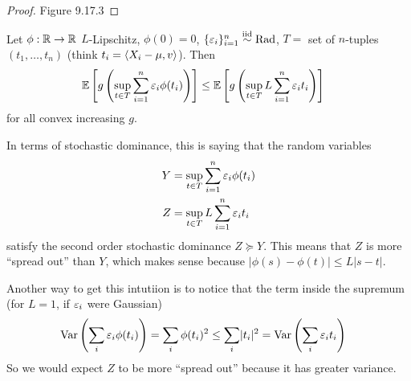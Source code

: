 \begin{proof}
  Figure 9.17.3
\end{proof}

\begin{theorem}
  Let $\phi : \mathbb{R} \to \mathbb{R}$ $L$-Lipschitz, $\phi(0) = 0$,
  $\{\varepsilon_i\}_{i=1}^n \overset{\text{iid}}{\sim} \text{Rad}$, $T =$ set of $n$-tuples $(t_1,\ldots,t_n)$
  (think $t_i = \braket{X_i - \mu, v}$). Then
  \begin{align}
    \mathbb{E}\left[g \left(
        \sup_{t \in T} \sum_{i=1}^n \varepsilon_i \phi(t_i)
    \right)\right]
    &\leq \mathbb{E}\left[
      g\left(
        \sup_{t \in T} L \sum_{i=1}^n \varepsilon_i t_i
      \right)
    \right]
  \end{align}
  for all convex increasing $g$.
\end{theorem}

In terms of stochastic dominance, this is saying that the random variables
\begin{align}
  Y &= \sup_{t \in T} \sum_{i=1}^n \varepsilon_i \phi(t_i) \\
  Z &= \sup_{t \in T} L \sum_{i=1}^n \varepsilon_i t_i
\end{align}
satisfy the second order stochastic dominance $Z \succeq Y$.
This means that $Z$ is more ``spread out'' than $Y$, which makes sense because
$\lvert \phi(s) - \phi(t) \rvert \leq L \lvert s - t \rvert$.

Another way to get this intutiion is to notice that the term inside the
supremum (for $L = 1$, if $\varepsilon_i$ were Gaussian)
\begin{align}
  \operatorname{Var}\left(\sum_{i} \varepsilon_i \phi(t_i)\right)
  &= \sum_i \phi(t_i)^2
  \leq \sum_{i} \lvert t_i \rvert^2
  = \operatorname{Var}\left(\sum_i \varepsilon_i t_i\right)
\end{align}
So we would expect $Z$ to be more ``spread out'' because it has greater
variance.

